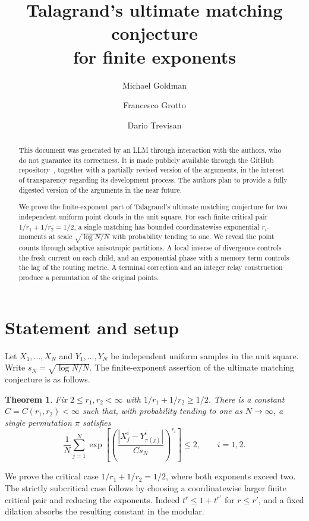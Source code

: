 \documentclass[11pt]{article}
\title{Talagrand's ultimate matching conjecture\\for finite exponents}
\author{Michael Goldman \and Francesco Grotto \and Dario Trevisan}
\date{}
\newenvironment{aiuse}
  {\renewcommand{\abstractname}{AI use}\begin{abstract}}
  {\end{abstract}}
\newtheorem{theorem}{Theorem}
\begin{document}
\maketitle

\begin{aiuse}
This document was generated by an LLM through interaction with the authors,
who do not guarantee its correctness. It is made publicly available through
the GitHub repository~\cite{umc:repository}, together with a partially
revised version of the arguments, in the interest of transparency regarding
its development process. The authors plan to provide a fully digested
version of the arguments in the near future.
\end{aiuse}

\begin{abstract}
We prove the finite-exponent part of Talagrand's ultimate matching
conjecture for two independent uniform point clouds in the unit square.
For each finite critical pair \(1/r_1+1/r_2=1/2\), a single matching
has bounded coordinatewise exponential \(r_i\)-moments at scale
\(\sqrt{\log N/N}\) with probability tending to one.
We reveal the point counts through adaptive anisotropic partitions.
A local inverse of divergence controls the fresh current on each child,
and an exponential phase with a memory term controls the lag of the
routing metric. A terminal correction and an integer relay construction
produce a permutation of the original points.
\end{abstract}

\section{Statement and setup}

Let \(X_1,\dots,X_N\) and \(Y_1,\dots,Y_N\) be independent uniform
samples in the unit square. Write \(s_N=\sqrt{\log N/N}\).
The finite-exponent assertion of the ultimate matching conjecture
\cite{TalagrandProblems} is as follows.

\begin{theorem}\label{thm:finite}
Fix \(2\le r_1,r_2<\infty\) with \(1/r_1+1/r_2\ge1/2\).
There is a constant \(C=C(r_1,r_2)<\infty\) such that, with
probability tending to one as \(N\to\infty\), a single permutation
\(\pi\) satisfies
\[
 \frac1N\sum_{j=1}^N
 \exp\!\left[
   \left(\frac{|X_j^i-Y_{\pi(j)}^i|}{C s_N}\right)^{r_i}
 \right]\le2,\qquad i=1,2 .
\]
\end{theorem}

We prove the critical case \(1/r_1+1/r_2=1/2\), where both
exponents exceed two. The strictly subcritical case follows by
choosing a coordinatewise larger finite critical pair and reducing
the exponents. Indeed \(t^r\le 1+t^{r'}\) for \(r\le r'\),
and a fixed dilation absorbs the resulting constant in the modular.
\end{document}
